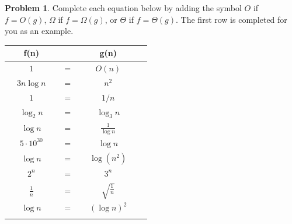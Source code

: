 \documentclass[10pt]{article}
\theoremstyle{definition}
\newtheorem{problem}{Problem}
\begin{document}
\begin{problem}
    Complete each equation below by adding the symbol $O$ if $f=O(g)$, $\Omega$ if $f=\Omega(g)$, or $\Theta$ if $f=\Theta(g)$.  
    The first row is completed for you as an example.

{\renewcommand{\arraystretch}{4.4}
\begin{tabular}{c c c c c c}
    & f(n) &~\hspace{0.5in}~$ $~\hspace{0.5in}~& g(n) &\\
    \hline
    & $1$ & ~\hspace{0.5in}~$=$~\hspace{0.5in}~  & $O(n)$ &  &\\
    \arrayrulecolor{gray}\hline
    & $3 n\log n$ & ~\hspace{0.5in}~$=$~\hspace{0.5in}~  & $n^2$ &  &\\
    \arrayrulecolor{gray}\hline
    & $1$ & ~\hspace{0.5in}~$=$~\hspace{0.5in}~  & $1/n$ &  &\\
    \arrayrulecolor{gray}\hline
    & $\log_2 n$ & ~\hspace{0.5in}~$=$~\hspace{0.5in}~  & $\log_3 n$ &  &\\
    \arrayrulecolor{gray}\hline
    & $\log n$ & ~\hspace{0.5in}~$=$~\hspace{0.5in}~  & $\frac {1} {\log n}$ &  &\\
    \arrayrulecolor{gray}\hline
    & $5\cdot10^{30}$ & ~\hspace{0.5in}~$=$~\hspace{0.5in}~  & $\log n$ &  &\\
    \arrayrulecolor{gray}\hline
    & $\log n$ & ~\hspace{0.5in}~$=$~\hspace{0.5in}~  & $\log (n^2)$ &  &\\
    \arrayrulecolor{gray}\hline
    & $2^n$ & ~\hspace{0.5in}~$=$~\hspace{0.5in}~  & $3^n$ &  &\\
    \arrayrulecolor{gray}\hline
    & $\frac 1 n$ & ~\hspace{0.5in}~$=$~\hspace{0.5in}~  & $\sqrt{\frac 1 n}$ &  &\\
    \arrayrulecolor{gray}\hline
    & $\log n$ & ~\hspace{0.5in}~$=$~\hspace{0.5in}~  & $(\log n)^2$ &  &\\
    \arrayrulecolor{gray}\hline


\end{tabular}}
\end{problem}
\end{document}
